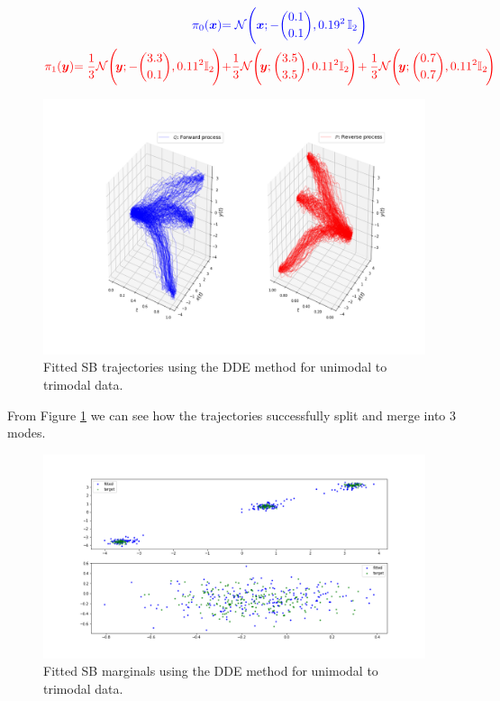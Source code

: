 \documentclass[a4paper,12pt,twoside,openright]{report}
\theoremstyle{definition}
\begin{document}
\begin{figure}[H]
\begin{adjustbox}{width=\columnwidth}
\parbox{\linewidth}{
\begin{align*}
    \color{blue}{\pi_0({\bm{x}})} &\color{blue}{= {\mathcal{N}}\Bigg({\bm{x}}; -{0.1\choose0.1},  0.19^2\, \mathbb{I}_2 \Bigg)} \\
    \color{red}{\pi_1({\bm{y}})} \color{red}{= \frac{1}{3}{\mathcal{N}}\Bigg(\!{\bm{y}}; -{3.3\choose0.1}, 0.11^2\mathbb{I}_2\!\Bigg)}&\color{red}{ + \frac{1}{3}{\mathcal{N}}\Bigg(\!{\bm{y}}; {3.5\choose3.5}, 0.11 ^2\mathbb{I}_2\!\Bigg)}\!+\color{red}{ \frac{1}{3}{\mathcal{N}}\Bigg(\!{\bm{y}}; {0.7\choose0.7}, 0.11 ^2\mathbb{I}_2\!\Bigg)}
\end{align*}
}
\end{adjustbox}
\end{figure}
\begin{figure}
    \centering
    \includegraphics[scale=0.4,trim={5.3cm 1cm 2.5cm 0}, clip]{images/GP/2d_3mode_GP_means_3.3_3.6_0.7_std_0.1_200.png}
    \caption{ Fitted SB trajectories using the DDE method for unimodal to trimodal data.  }
    \label{fig:3mode2d200trajectroies2d}
\end{figure}
From Figure \ref{fig:3mode2d200trajectroies2d}  we can see how the trajectories successfully split and merge into 3 modes.
\begin{figure}
    \centering
    \includegraphics[scale=0.4,trim={2.3cm 1cm 2.5cm 0}, clip]{images/GP/2d_3mode_GP_means_3.3_3.6_0.7_std_0.1_scatter_200_.png}
    \caption{ Fitted SB marginals using the DDE method for unimodal to trimodal data.}
    \label{fig:3mode2d200}
\end{figure}
\end{document}
